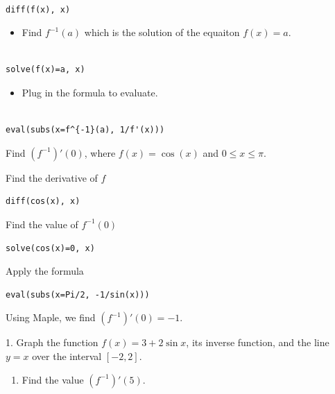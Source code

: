 \documentclass[]{book}
\providecommand{\tightlist}{%
  \setlength{\itemsep}{0pt}\setlength{\parskip}{0pt}}
\theoremstyle{definition}
\theoremstyle{definition}
\theoremstyle{definition}
\theoremstyle{remark}
\let\BeginKnitrBlock\begin \let\EndKnitrBlock\end
\begin{document}
\begin{verbatim}

diff(f(x), x)
\end{verbatim}

\begin{itemize}
\tightlist
\item
  Find \(f^{-1}(a)\) which is the solution of the equaiton \(f(x)=a\).
\end{itemize}

\begin{verbatim}

solve(f(x)=a, x)
\end{verbatim}

\begin{itemize}
\tightlist
\item
  Plug in the formula to evaluate.
\end{itemize}

\begin{verbatim}

eval(subs(x=f^{-1}(a), 1/f'(x)))
\end{verbatim}

\BeginKnitrBlock{example}
\protect\hypertarget{exm:unnamed-chunk-98}{}{\label{exm:unnamed-chunk-98} }Find \((f^{-1})'(0)\), where \(f(x)=\cos(x)\) and \(0\leq x\leq \pi\).
\EndKnitrBlock{example}

\BeginKnitrBlock{solution}
{}
Find the derivative of \(f\)

\begin{verbatim}
diff(cos(x), x)
\end{verbatim}

Find the value of \(f^{-1}(0)\)

\begin{verbatim}
solve(cos(x)=0, x)
\end{verbatim}

Apply the formula

\begin{verbatim}
eval(subs(x=Pi/2, -1/sin(x)))
\end{verbatim}

Using Maple, we find \((f^{-1})'(0)=-1\).
\EndKnitrBlock{solution}

\BeginKnitrBlock{exercise}
\protect\hypertarget{exr:unnamed-chunk-100}{}{\label{exr:unnamed-chunk-100} }
1. Graph the function \(f(x)=3+2\sin x\), its inverse function, and the line \(y=x\) over the interval \([-2,2]\).

\begin{enumerate}
\def\labelenumi{\arabic{enumi}.}
\setcounter{enumi}{1}
\tightlist
\item
  Find the value \((f^{-1})'(5)\).
\end{enumerate}
\EndKnitrBlock{exercise}
\end{document}
